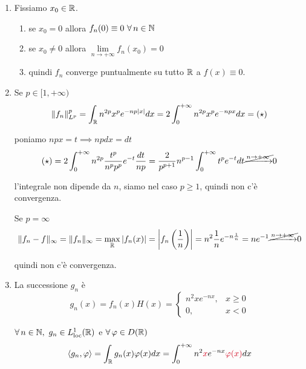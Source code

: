\begin{enumerate}
\item Fissiamo $x_{0} \in \mathbb{R} $.
\begin{enumerate}
\item se $x_{0} = 0$ allora $f_{n}(0) \equiv 0\ \forall n\in \NN $
\item se $x_{0} \neq 0$ allora $\lim\limits_{n\rightarrow + \infty} f_{n}(x_{0}) = 0$
\item quindi $f_{n}$ converge puntualmente su tutto $\mathbb{R} $ a $f(x) \equiv 0$.
\end{enumerate}

\item Se $p\in [ 1, + \infty)$
\begin{equation*}
\Vert f_{n}\Vert^{p}_{L^{p}} = \int_{\mathbb{R}} n^{2p} x^{p} e^{- np| x|} dx = 2\int^{+ \infty}_{0} n^{2p} x^{p} e^{- npx} dx = (\star)
\end{equation*}

poniamo $npx = t\implies npdx = dt$
\begin{equation*}
(\star) = 2\int^{+ \infty}_{0} n^{2p}\frac{t^{p}}{n^{p} p^{p}} e^{- t}\frac{dt}{np} = \frac{2}{p^{p + 1}} n^{p - 1}\int^{+ \infty}_{0} t^{p} e^{- t} dt\cancel{\xrightarrow{n\rightarrow + \infty}} 0
\end{equation*}

l'integrale non dipende da $n$, siamo nel caso $p \geq 1$, quindi non c'è convergenza.

Se $p = \infty $
\begin{equation*}
\Vert f_{n} - f\Vert_{\infty} = \Vert f_{n}\Vert_{\infty} = \max_{\mathbb{R}}| f_{n}(x)| = \left| f_{n}\left(\frac{1}{n}\right)\right| = n^{2}\frac{1}{n} e^{- n\frac{1}{n}} = ne^{- 1}\cancel{\xrightarrow{n\rightarrow + \infty}} 0
\end{equation*}

quindi non c'è convergenza.
\item La successione $g_{n}$ è
\begin{equation*}
g_{n}(x) = f_{n}(x) H(x) = 
\begin{cases}
n^{2} xe^{- nx}, & x \geq 0\\
0, & x < 0
\end{cases}
\end{equation*}

$\forall n\in \NN, \ g_{n} \in L^{1}_{\loc}(\RR)$ e $\forall \varphi \in D(\RR)$
\begin{equation*}
\langle g_{n}, \varphi \rangle = \int_{\RR} g_{n}(x) \varphi (x) dx = \int^{+ \infty}_{0} n^{2}\textcolor[rgb]{0.82, 0.01, 0.11}{x} e^{- nx}\textcolor[rgb]{0.82, 0.01, 0.11}{\varphi}\textcolor[rgb]{0.82, 0.01, 0.11}{(}\textcolor[rgb]{0.82, 0.01, 0.11}{x}\textcolor[rgb]{0.82, 0.01, 0.11}{)} dx
\end{equation*}


\end{enumerate}
